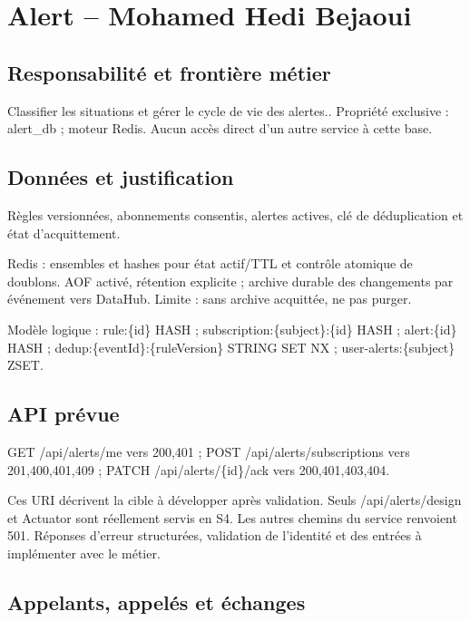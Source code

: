 \documentclass[10pt,a4paper]{article}
\begin{document}
\section*{Alert  --  Mohamed Hedi Bejaoui}

\subsection*{Responsabilité et frontière métier}

Classifier les situations et gérer le cycle de vie des alertes.. Propriété exclusive : alert\_db ; moteur Redis. Aucun accès direct d'un autre service à cette base.\par

\subsection*{Données et justification}

Règles versionnées, abonnements consentis, alertes actives, clé de déduplication et état d'acquittement.\par

Redis : ensembles et hashes pour état actif/TTL et contrôle atomique de doublons. AOF activé, rétention explicite ; archive durable des changements par événement vers DataHub. Limite : sans archive acquittée, ne pas purger.\par

Modèle logique : rule:\{id\} HASH ; subscription:\{subject\}:\{id\} HASH ; alert:\{id\} HASH ; dedup:\{eventId\}:\{ruleVersion\} STRING SET NX ; user-alerts:\{subject\} ZSET.\par

\subsection*{API prévue}

GET /api/alerts/me  vers  200,401 ; POST /api/alerts/subscriptions  vers  201,400,401,409 ; PATCH /api/alerts/\{id\}/ack  vers  200,401,403,404.\par

Ces URI décrivent la cible à développer après validation. Seuls /api/alerts/design et Actuator sont réellement servis en S4. Les autres chemins du service renvoient 501. Réponses d'erreur structurées, validation de l'identité et des entrées à implémenter avec le métier.\par

\subsection*{Appelants, appelés et échanges}
\end{document}
